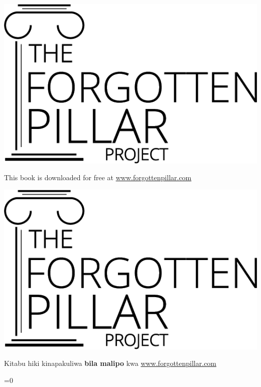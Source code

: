 {\ifepub
    \includegraphics[width=\linewidth]{images/logo-black.png}

    This book is downloaded for free at \href{https://forgottenpillar.com/book/the-forgotten-pillar}{www.forgottenpillar.com}
\else
    \noindent
    \begin{minipage}{0.3\textwidth}
        \includegraphics[width=\linewidth]{images/logo-black.png}
    \end{minipage}%
    \hfill
    \begin{minipage}{\dimexpr\linewidth-0.3\textwidth-0.125\textwidth-1em\relax}
        \raggedleft\footnotesize
        Kitabu hiki kinapakuliwa \textbf{bila malipo} kwa \href{https://forgottenpillar.com/book/the-forgotten-pillar?lang=\currentlang&type=\currentlayout}{www.forgottenpillar.com}
    \end{minipage}%
    \ifnum{}=0
    \else
        \hfill
        \begin{minipage}{0.125\textwidth}
            \centering
        \end{minipage}
    \fi%
\fi
}

\pagebreak